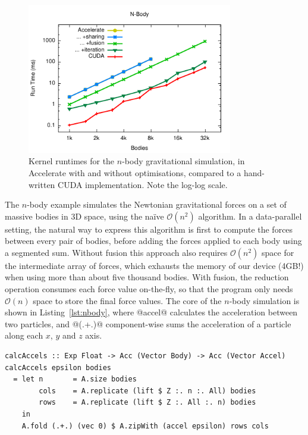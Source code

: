\begin{figure}
    \begin{center}
        \includegraphics[width=0.8\textwidth]{images/results/nbody/nbody}
    \end{center}
    \caption[N-body gravitational simulation kernel benchmarks]{Kernel runtimes
        for the $n$-body gravitational simulation, in Accelerate with and
        without optimisations, compared to a hand-written CUDA implementation.
        Note the log-log scale.}
    \label{fig:nbody}
\end{figure}

The $n$-body example simulates the Newtonian gravitational forces on a set of
massive bodies in 3D space, using the na\"ive $\mathcal{O}\left( n^{2} \right)$
algorithm. In a data-parallel setting, the natural way to express this algorithm
is first to compute the forces between every pair of bodies, before adding the
forces applied to each body using a segmented sum. Without fusion this approach
also requires $\mathcal{O}\left( n^{2} \right)$ space for the intermediate array
of forces, which exhausts the memory of our device (4GB!) when using more than
about five thousand bodies. With fusion, the reduction operation consumes each
force value on-the-fly, so that the program only needs $\mathcal{O}\left( n
\right)$ space to store the final force values. The core of the $n$-body
simulation is shown in Listing~\ref{lst:nbody}, where @accel@ calculates
the acceleration between two particles, and @(.+.)@ component-wise sums the
acceleration of a particle along each $x$, $y$ and $z$ axis.

\begin{lstlisting}[style=haskell_float
    ,label=lst:nbody
    ,caption={$N$-body gravitational simulation, using parallel reduction}]
calcAccels :: Exp Float -> Acc (Vector Body) -> Acc (Vector Accel)
calcAccels epsilon bodies
  = let n       = A.size bodies
        cols    = A.replicate (lift $ Z :. n :. All) bodies
        rows    = A.replicate (lift $ Z :. All :. n) bodies
    in
    A.fold (.+.) (vec 0) $ A.zipWith (accel epsilon) rows cols
\end{lstlisting}


